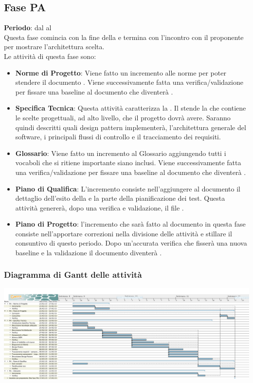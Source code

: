 \subsection{Fase PA}
	\textbf{Periodo}: dal  al  \\Questa fase comincia con la fine della  e termina con l'incontro con il proponente per mostrare l'architettura scelta. \\Le attività di questa fase sono:
	\begin{itemize}
		\item \textbf{Norme di Progetto}: Viene fatto un incremento alle norme per poter stendere il documento . Viene successivamente fatta una verifica/validazione per fissare una baseline al documento che diventerà .
		\item \textbf{Specifica Tecnica}: Questa attività caratterizza la . Il  stende la  che contiene le scelte progettuali, ad alto livello, che il progetto dovrà avere. Saranno quindi descritti quali design pattern \projectname implementerà, l'architettura generale del software, i principali flussi di controllo e il tracciamento dei requisiti.
		\item \textbf{Glossario}: Viene fatto un incremento al Glossario aggiungendo tutti i vocaboli che si ritiene importante siano inclusi. Viene successivamente fatta una verifica/validazione per fissare una baseline al documento che diventerà .
		\item \textbf{Piano di Qualifica}: L'incremento consiste nell'aggiungere al documento  il dettaglio dell'esito della  e la parte della pianificazione dei test. Questa attività genererà, dopo una verifica e validazione, il file .
		\item \textbf{Piano di Progetto}: l'incremento che sarà fatto al documento  in questa fase consiste nell'apportare correzioni nella divisione delle attività e stillare il consuntivo di questo periodo. Dopo un'accurata verifica che fisserà una nuova baseline e la validazione il documento diventerà .
	\end{itemize}
	\subsubsection{Diagramma di Gantt delle attività}
		\includegraphics[scale=0.27]{PianoDiProgetto/Pics/FasePA.png}